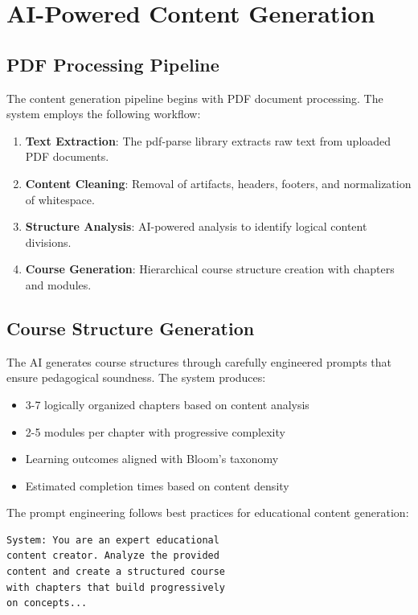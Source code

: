 \documentclass[conference]{IEEEtran}
\begin{document}
\section{AI-Powered Content Generation}

\subsection{PDF Processing Pipeline}

The content generation pipeline begins with PDF document processing. The system employs the following workflow:

\begin{enumerate}
    \item \textbf{Text Extraction}: The pdf-parse library extracts raw text from uploaded PDF documents.
    \item \textbf{Content Cleaning}: Removal of artifacts, headers, footers, and normalization of whitespace.
    \item \textbf{Structure Analysis}: AI-powered analysis to identify logical content divisions.
    \item \textbf{Course Generation}: Hierarchical course structure creation with chapters and modules.
\end{enumerate}

\subsection{Course Structure Generation}

The AI generates course structures through carefully engineered prompts that ensure pedagogical soundness. The system produces:

\begin{itemize}
    \item 3-7 logically organized chapters based on content analysis
    \item 2-5 modules per chapter with progressive complexity
    \item Learning outcomes aligned with Bloom's taxonomy
    \item Estimated completion times based on content density
\end{itemize}

The prompt engineering follows best practices for educational content generation:

\begin{verbatim}
System: You are an expert educational
content creator. Analyze the provided
content and create a structured course
with chapters that build progressively
on concepts...
\end{verbatim}
\end{document}
